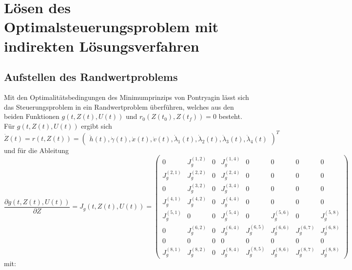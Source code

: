 \chapter{Lösen des Optimalsteuerungsproblem mit indirekten Lösungsverfahren}

\section{Aufstellen des Randwertproblems}
Mit den Optimalitätsbedingungen des Minimumprinzips von Pontryagin lässt sich das Steuerungsproblem in ein Randwertproblem überführen, welches aus den beiden Funktionen $g(t,Z(t),U(t))$ und $r_0(Z(t_0),Z(t_f)) = 0$ besteht. Für $g(t,Z(t),U(t))$ ergibt sich \[\dot{Z}(t) = r(t,Z(t)) = \begin{pmatrix}
\dot{h}(t),\dot{\gamma}(t),\dot{x}(t),\dot{v}(t),\dot{\lambda}_1(t),\dot{\lambda}_2(t),\dot{\lambda}_3(t),\dot{\lambda}_4(t)
\end{pmatrix}^T\]
und für die Ableitung
\[\dfrac{\partial g(t,Z(t),U(t))}{\partial Z} = J_g(t,Z(t),U(t)) = \begin{pmatrix}
0 & J_g^{(1,2)} & 0 & J_g^{(1,4)} & 0 & 0 & 0 & 0 \\ 
J_g^{(2,1)} & J_g^{(2,2)} & 0 & J_g^{(2,4)} & 0 & 0 & 0 & 0 \\ 
0 & J_g^{(3,2)} & 0 & J_g^{(3,4)} & 0 & 0 & 0 & 0 \\ 
J_g^{(4,1)} & J_g^{(4,2)} & 0 & J_g^{(4,4)} & 0 & 0 & 0 & 0 \\
J_g^{(5,1)} & 0 & 0 & J_g^{(5,4)} & 0 & J_g^{(5,6)} & 0 & J_g^{(5,8)} \\
0 & J_g^{(6,2)} & 0 & J_g^{(6,4)} & J_g^{(6,5)} & J_g^{(6,6)} & J_g^{(6,7)} & J_g^{(6,8)} \\
0 & 0 & 0 & 0 & 0 & 0 & 0 & 0 \\
J_g^{(8,1)} & J_g^{(8,2)} & 0 & J_g^{(8,4)} & J_g^{(8,5)} & J_g^{(8,6)} & J_g^{(8,7)} & J_g^{(8,8)}
\end{pmatrix}\]
mit:
